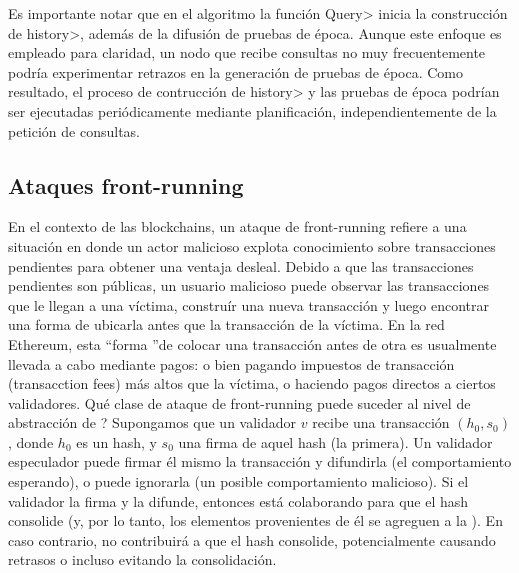 Es importante notar que en el algoritmo la función \<Query> inicia la construcción de \<history>, además de
la difusión de pruebas de época.
%
Aunque este enfoque es empleado para claridad, un nodo que recibe consultas
no muy frecuentemente podría experimentar retrazos en la generación de pruebas de época.
%
Como resultado, el proceso de contrucción de \<history> y las pruebas de época podrían ser ejecutadas
periódicamente mediante planificación, independientemente de la petición de consultas.



%

\subsection{Ataques front-running}
En el contexto de las blockchains, un ataque de front-running refiere a una situación en donde
un actor malicioso explota conocimiento sobre transacciones pendientes para obtener una ventaja
desleal. Debido a que las transacciones pendientes son públicas, un usuario malicioso puede
observar las transacciones que le llegan a una víctima, construír una nueva transacción y luego
encontrar una forma de ubicarla antes que la transacción de la víctima. En la red Ethereum, esta
\textquotedblleft forma \textquotedblright de colocar una transacción antes de otra es usualmente
llevada a cabo mediante pagos: o bien pagando impuestos de transacción (transacction fees) más altos
que la víctima, o haciendo pagos directos a ciertos validadores.
%
Qué clase de ataque de front-running puede suceder al nivel de abstracción de \hashchain?
Supongamos que un validador $v$ recibe una transacción $(h_0, s_0)$, donde $h_0$ es un hash,
y $s_0$ una firma de aquel hash (la primera). Un validador especulador puede firmar él mismo la
transacción y difundirla (el comportamiento esperando), o puede ignorarla (un posible comportamiento
malicioso). Si el validador la firma y la difunde, entonces está colaborando para que el hash
consolide (y, por lo tanto, los elementos provenientes de él se agreguen a la  \hashchain).
En caso contrario, no contribuirá a que el hash consolide, potencialmente causando retrasos
o incluso evitando la consolidación.
%

